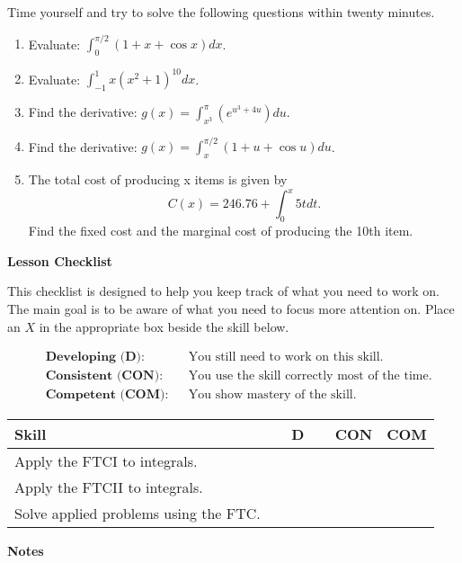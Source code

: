 \documentclass[10pt]{book}
\theoremstyle{definition}
\theoremstyle{remark}
\begin{document}
\begin{large}
\noindent
Time yourself and try to solve the following questions within twenty minutes. 
\begin{enumerate}
\item Evaluate: $\displaystyle \int_{0}^{\pi/2} \left(1 + x + \cos x\right) dx$.\vfil
\item Evaluate: $\displaystyle \int_{-1}^{1} x(x^2+1)^{10} dx$.\vfil
\item Find the derivative: $g(x) = \displaystyle \int_{x^3}^{\pi} \left(e^{u^3 + 4u} \right) du$. \vfil
\item Find the derivative: $g(x) = \displaystyle \int_{x}^{\pi/2} \left(1 + u + \cos u\right) du$.\vfil
\item The total cost of producing x items is given by \[C(x) = 246.76 + \int_{0}^x 5t dt.\]  Find the fixed cost and the marginal cost of producing the 10th item.\vfil
\end{enumerate}

\noindent
\textbf{Lesson Checklist}
\bigskip

\noindent
This checklist is designed to help you keep track of what you need to work on. The main goal is to be aware of what you need to focus more attention on. Place an $X$ in the appropriate box beside the skill below. 
\bigskip

\noindent
\begin{align*}
&\textbf{Developing (D):} &&\textrm{You still need to work on this skill.}\\
&\textbf{Consistent (CON):} &&\textrm{You use the skill correctly most of the time.}\\
&\textbf{Competent (COM):} &&\textrm{You show mastery of the skill.} 
\end{align*}
\vfil

\begin{center}
\begin{tabular}{|l|l|l|l|}
\hline
\textbf{Skill} & \textbf{~~D~~} & \textbf{CON} & \textbf{COM} \\
\hline
Apply the FTCI to integrals. &&&\\
\hline
Apply the FTCII to integrals. &&&\\
\hline
Solve applied problems using the FTC. &&&\\
\hline
\end{tabular}
\end{center}
\vfil

\noindent
\textbf{Notes}
\end{large} \vfil
\newpage
\end{document}
